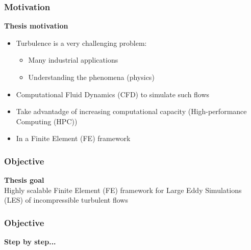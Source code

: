 \begin{frame}
\frametitle{Motivation}
\vfill
{\bf Thesis motivation }\\
\begin{itemize}
\item<2-> Turbulence is a very challenging problem:
\begin{itemize}
\item Many industrial applications
\item Understanding the phenomena (physics)
\end{itemize}
\item<3-> Computational Fluid Dynamics (CFD) to simulate such flows
\item<4-> Take advantadge of increasing computational capacity (High-performance Computing (HPC))
\item<5-> In a Finite Element (FE) framework
\end{itemize}
\vfill
\end{frame}
\begin{frame}
\frametitle{Objective}
\vfill
{\bf Thesis goal }\\
Highly scalable Finite Element (FE) framework for Large Eddy Simulations (LES) of incompressible turbulent flows\\
\vspace{0.5cm}
\vfill
\end{frame}
\begin{frame}
\frametitle{Objective}
\vfill
\textbf{Step by step...}
\begin{itemize}
\end{itemize}
\vfill
\end{frame}